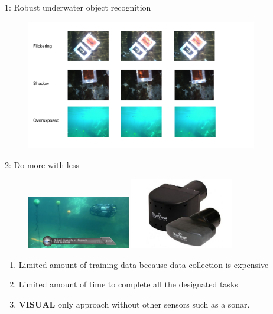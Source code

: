 \documentclass[13pt]{beamer}
\begin{document}
\begin{frame}{1: Robust underwater object recognition}
  \begin{figure}[ht]
      \centering
      \includegraphics[width=0.9\textwidth, height=0.6\textwidth]{figs/data2.png}
  \end{figure}
\end{frame}

\begin{frame}{2: Do more with less}

    \begin{figure}[ht]
        \centering
        \includegraphics[width=0.4\textwidth, height=0.3\textheight]{figs/problem2_1.png}\hspace{2em}
        \includegraphics[width=0.4\textwidth, height=0.3\textheight]{figs/sonar.jpg}
    \end{figure}

  \begin{enumerate}
    \item Limited amount of training data because data collection is expensive
    \item Limited amount of time to complete all the designated tasks
    \item \textbf{VISUAL} only approach without other sensors such as a sonar.
  \end{enumerate}

\end{frame}
\end{document}
